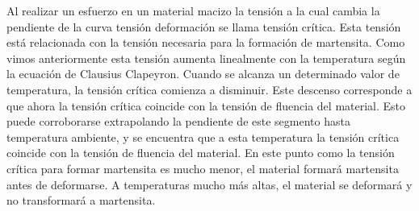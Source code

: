 \documentclass[a4paper,12pt,fleqn,twoside,openany]{book}
\begin{document}
Al realizar un esfuerzo en un material macizo la tensión a la cual cambia la pendiente de la curva tensión deformación se llama tensión crítica. Esta 
tensión está relacionada con la tensión necesaria para la formación de martensita. Como vimos anteriormente esta tensión aumenta linealmente con la temperatura según la 
ecuación de Clausius Clapeyron. Cuando se alcanza un determinado valor de temperatura, la tensión crítica comienza a disminuir. Este descenso corresponde a que ahora la tensión crítica 
coincide con la tensión de fluencia del material. Esto puede corroborarse extrapolando la pendiente de este segmento hasta temperatura ambiente, y se encuentra que a esta 
temperatura la tensión crítica coincide con la tensión de fluencia del material. En este punto como la tensión crítica para formar martensita es mucho menor, el 
material formará martensita antes de deformarse. A temperaturas mucho más altas, el material se deformará y no transformará a martensita.
\end{document}
